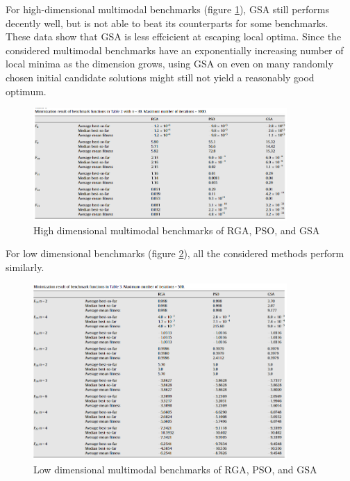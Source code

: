 \documentclass{article}
\begin{document}
        For high-dimensional multimodal benchmarks (figure \ref{fig:multimodalHigh}), GSA still performs decently well, but is not able to beat its counterparts for some benchmarks.  These data show that GSA is less effcicient at escaping local optima.  Since the considered multimodal benchmarks have an exponentially increasing number of local minima as the dimension grows, using GSA on even on many randomly chosen initial candidate solutions might still not yield a reasonably good optimum.

        \begin{figure}[h]
            \centering
            \includegraphics*[width=0.86\textwidth]{images/multimodal_variable_dimensions.png}
            \caption{High dimensional multimodal benchmarks of RGA, PSO, and GSA}
            \label{fig:multimodalHigh}
        \end{figure}

\pagebreak

        For low dimensional benchmarks (figure \ref{fig:multimodalLow}), all the considered methods perform similarly.

        \begin{figure}[h]
            \centering
            \includegraphics*[width=0.86\textwidth]{images/multimodal_fixed.png}
            \caption{Low dimensional multimodal benchmarks of RGA, PSO, and GSA}
            \label{fig:multimodalLow}
        \end{figure}
\end{document}
